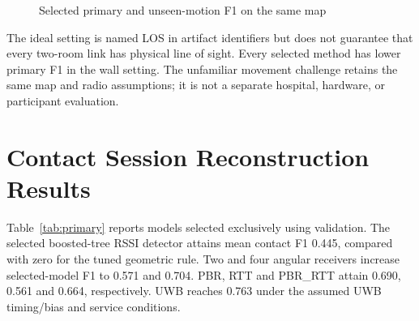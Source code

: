 \documentclass[12pt,a4paper]{report}
\begin{document}
\begin{figure}[htbp]
\centering
{}
\caption{Selected primary and unseen-motion F1 on the same map}\label{fig:generalization}
\end{figure}


The ideal setting is named LOS in artifact identifiers but does not guarantee that every two-room link has physical line of sight. Every selected method has lower primary F1 in the wall setting. The unfamiliar movement challenge retains the same map and radio assumptions; it is not a separate hospital, hardware, or participant evaluation.

\section{Contact Session Reconstruction Results}
Table~\ref{tab:primary} reports models selected exclusively using validation. The selected boosted-tree RSSI detector attains mean contact F1 0.445, compared with zero for the tuned geometric rule. Two and four angular receivers increase selected-model F1 to 0.571 and 0.704. PBR, RTT and PBR\_RTT attain 0.690, 0.561 and 0.664, respectively. UWB reaches 0.763 under the assumed UWB timing/bias and service conditions.
\end{document}
